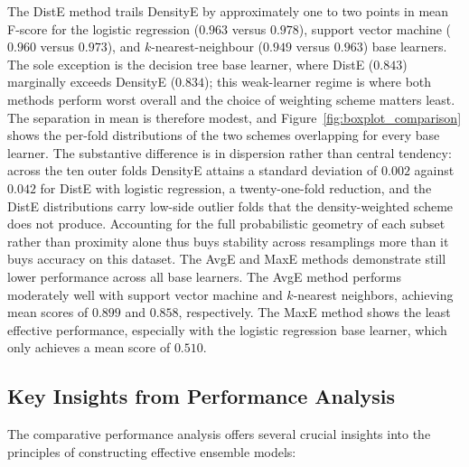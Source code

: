 \documentclass[lettersize,journal]{IEEEtran}
\begin{document}
	The DistE method trails DensityE by approximately one to two points in mean F-score for the logistic
	regression ($0.963$ versus $0.978$), support vector machine ($0.960$ versus $0.973$), and
	$k$-nearest-neighbour ($0.949$ versus $0.963$) base learners. The sole exception is the decision
	tree base learner, where DistE ($0.843$) marginally exceeds DensityE ($0.834$); this weak-learner
	regime is where both methods perform worst overall and the choice of weighting scheme matters
	least. The separation in mean is therefore modest, and Figure~\ref{fig:boxplot_comparison} shows
	the per-fold distributions of the two schemes overlapping for every base learner. The substantive
	difference is in dispersion rather than central tendency: across the ten outer folds DensityE
	attains a standard deviation of $0.002$ against $0.042$ for DistE with logistic regression, a
	twenty-one-fold reduction, and the DistE distributions carry low-side outlier folds that the
	density-weighted scheme does not produce. Accounting for the full probabilistic geometry of each
	subset rather than proximity alone thus buys stability across resamplings more than it buys
	accuracy on this dataset. The AvgE and MaxE methods demonstrate still lower performance across all base learners. The
	AvgE method performs moderately well with support vector machine and
	$k$-nearest neighbors, achieving mean scores of $0.899$ and $0.858$, respectively.
	The MaxE method shows the least effective performance, especially with the
	logistic regression base learner, which only achieves a mean score of $0.510$.
	
	\subsection{Key Insights from Performance Analysis}
	
	The comparative performance analysis offers several crucial insights into the principles of constructing effective ensemble models:
	
\end{document}
